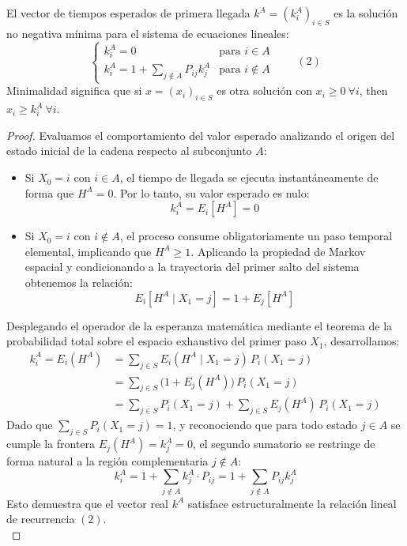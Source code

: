 \begin{teo}
    El vector de tiempos esperados de primera llegada $k^A = (k_i^A)_{i \in S}$ es la solución no negativa mínima para el sistema de ecuaciones lineales:
    \[
    \begin{cases} 
        k_i^A = 0 & \text{para } i \in A \\ 
        k_i^A = 1 + \sum\limits_{j \notin A} P_{ij} k_j^A & \text{para } i \notin A 
    \end{cases} \qquad (2)
    \]
    Minimalidad significa que si $x = (x_i)_{i \in S}$ es otra solución con $x_i \geq 0 \ \forall i$, then $x_i \geq k_i^A \ \forall i$.

\begin{proof}
    Evaluamos el comportamiento del valor esperado analizando el origen del estado inicial de la cadena respecto al subconjunto $A$:
    \begin{itemize}
        \item Si $X_0 = i$ con $i \in A$, el tiempo de llegada se ejecuta instantáneamente de forma que $H^A = 0$. Por lo tanto, su valor esperado es nulo:
        \[
        k_i^A = E_i[H^A] = 0
        \]
        \item Si $X_0 = i$ con $i \notin A$, el proceso consume obligatoriamente un paso temporal elemental, implicando que $H^A \geq 1$. Aplicando la propiedad de Markov espacial y condicionando a la trayectoria del primer salto del sistema obtenemos la relación:
        \[
        E_i[H^A \mid X_1 = j] = 1 + E_j[H^A]
        \]
    \end{itemize}
    Desplegando el operador de la esperanza matemática mediante el teorema de la probabilidad total sobre el espacio exhaustivo del primer paso $X_1$, desarrollamos:
    \begin{align*}
        k_i^A = E_i(H^A) &= \sum_{j \in S} E_i(H^A \mid X_1 = j) \, P_i(X_1 = j) \\
        &= \sum_{j \in S} \big(1 + E_j(H^A)\big) \, P_i(X_1 = j) \\
        &= \sum_{j \in S} P_i(X_1 = j) + \sum_{j \in S} E_j(H^A) \, P_i(X_1 = j)
    \end{align*}
    Dado que $\sum_{j \in S} P_i(X_1 = j) = 1$, y reconociendo que para todo estado $j \in A$ se cumple la frontera $E_j(H^A) = k_j^A = 0$, el segundo sumatorio se restringe de forma natural a la región complementaria $j \notin A$:
    \[
    k_i^A = 1 + \sum_{j \notin A} k_j^A \cdot P_{ij} = 1 + \sum_{j \notin A} P_{ij} k_j^A
    \]
    Esto demuestra que el vector real $k^A$ satisface estructuralmente la relación lineal de recurrencia $(2)$.\\


\end{proof}
\end{teo}
